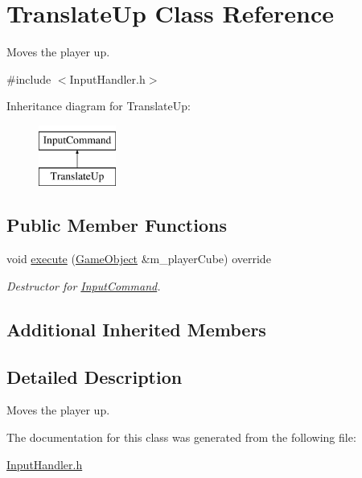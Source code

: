 \hypertarget{class_translate_up}{}\section{Translate\+Up Class Reference}
\label{class_translate_up}


Moves the player up.  




{\ttfamily \#include $<$Input\+Handler.\+h$>$}

Inheritance diagram for Translate\+Up\+:\begin{figure}[H]
\begin{center}
\leavevmode
\includegraphics[height=2.000000cm]{class_translate_up}
\end{center}
\end{figure}
\subsection*{Public Member Functions}
\begin{DoxyCompactItemize}
\item 
\mbox{\label{class_translate_up_acd9092819d11982ec89dede8d8b67818}} 
void \mbox{\hyperlink{class_translate_up_acd9092819d11982ec89dede8d8b67818}{execute}} (\mbox{\hyperlink{class_game_object}{Game\+Object}} \&m\+\_\+player\+Cube) override
\begin{DoxyCompactList}\small\item\em Destructor for \mbox{\hyperlink{class_input_command}{Input\+Command}}. \end{DoxyCompactList}\end{DoxyCompactItemize}
\subsection*{Additional Inherited Members}


\subsection{Detailed Description}
Moves the player up. 

The documentation for this class was generated from the following file\+:\begin{DoxyCompactItemize}
\item 
\mbox{\hyperlink{_input_handler_8h}{Input\+Handler.\+h}}\end{DoxyCompactItemize}
